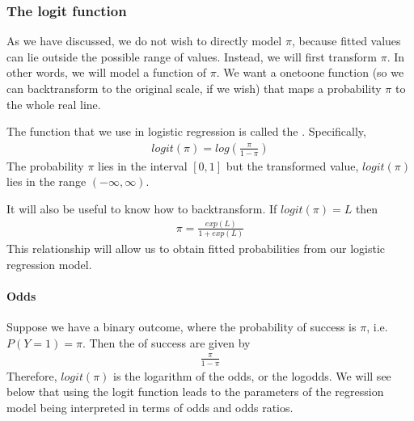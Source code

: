 \documentclass[letterpaper,10pt,english]{jupyterBook}
\begin{document}
\subsubsection{The logit function}
\label{\detokenize{15.d. Logistic Regression:the-logit-function}}
\sphinxAtStartPar
As we have discussed, we do not wish to directly model \(\pi\), because fitted values can lie outside the possible range of values. Instead, we will first transform \(\pi\). In other words, we will model a function of \(\pi\). We want a one\sphinxhyphen{}to\sphinxhyphen{}one function (so we can back\sphinxhyphen{}transform to the original scale, if we wish) that maps a probability \(\pi\) to the whole real line.

\sphinxAtStartPar
The function that we use in logistic regression is called the . Specifically,
\begin{equation*}
\begin{split}
logit(\pi) = log\left(\frac{\pi}{1-\pi}\right)
\end{split}
\end{equation*}
\sphinxAtStartPar
The probability \(\pi\) lies in the interval \([0,1]\) but the transformed value, \(logit(\pi)\) lies in the range \((-\infty, \infty)\).

\sphinxAtStartPar
It will also be useful to know how to back\sphinxhyphen{}transform. If \(logit(\pi) = L\) then
\begin{equation*}
\begin{split}
\pi = \frac{exp(L)}{1 + exp(L)}
\end{split}
\end{equation*}
\sphinxAtStartPar
This relationship will allow us to obtain fitted probabilities from our logistic regression model.


\paragraph{Odds}
\label{\detokenize{15.d. Logistic Regression:odds}}
\sphinxAtStartPar
Suppose we have a binary outcome, where the probability of success is \(\pi\), i.e. \(P(Y=1) = \pi\). Then the  of success are given by
\begin{equation*}
\begin{split}
\frac{\pi}{1-\pi}
\end{split}
\end{equation*}
\sphinxAtStartPar
Therefore, \(logit(\pi)\) is the logarithm of the odds, or the log\sphinxhyphen{}odds. We will see below that using the logit function leads to the parameters of the regression model being interpreted in terms of odds and odds ratios.
\end{document}
